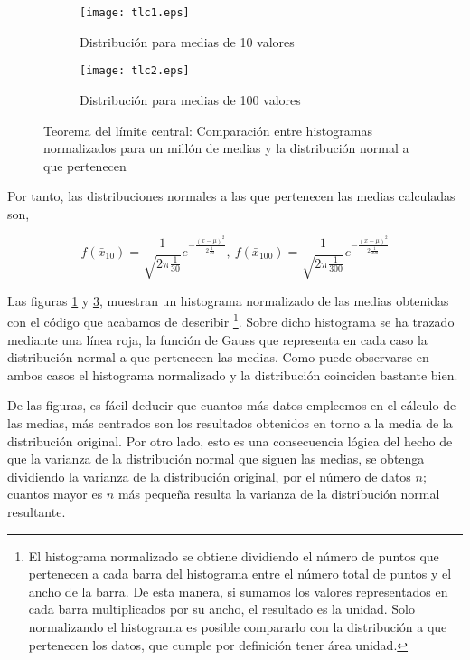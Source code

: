 \begin{figure}
\centering
\begin{subfigure}{0.35\textwidth}
	{\texttt{[image: tlc1.eps]}}
\caption{Distribución para medias de 10 valores}\label{fig:tlc10}
\end{subfigure} 
\begin{subfigure}{0.35\textwidth}
	{\texttt{[image: tlc2.eps]}}
	\caption{Distribución para medias de 100 valores}  \label{fig:tlc100}
\end{subfigure}
\caption{Teorema del límite central: Comparación entre histogramas normalizados para un millón de medias y la distribución normal a que pertenecen}
\end{figure}


Por tanto, las distribuciones normales a las que pertenecen las medias calculadas son,


\begin{equation*}
f(\bar{x}_{10})=\frac{1}{\sqrt{2\pi\frac{1}{30}}}e^{-\frac{(x-\mu)^2}{2\frac{1}{30}}},\  f(\bar{x}_{100})=\frac{1}{\sqrt{2\pi\frac{1}{300}}}e^{-\frac{(x-\mu)^2}{2\frac{1}{300}}}
\end{equation*}

Las figuras \ref{fig:tlc10} y \ref{fig:tlc100}, muestran un histograma normalizado de las medias obtenidas con el código que acabamos de describir \footnote{El histograma normalizado se obtiene dividiendo el número de puntos que pertenecen a cada barra del histograma entre el número total de puntos y el ancho de la barra. De esta manera, si sumamos los valores representados en cada barra multiplicados por su ancho, el resultado es la unidad. Solo normalizando el histograma es posible compararlo con la distribución a que pertenecen los datos, que cumple por definición tener área unidad.}. Sobre dicho histograma se ha trazado mediante una línea roja, la función de Gauss que representa en cada caso la distribución normal a que pertenecen las medias. Como puede observarse en ambos casos el histograma normalizado y la distribución coinciden bastante bien.

De las figuras, es fácil deducir que cuantos más datos empleemos en el cálculo de las medias, más centrados son los resultados obtenidos en torno a la media de la distribución original. Por otro lado, esto es una consecuencia lógica del hecho de que la varianza de la distribución normal que siguen las medias, se obtenga dividiendo la varianza de la distribución original, por el número de datos $n$; cuantos mayor es $n$ más pequeña resulta la varianza de la distribución normal resultante.
 
